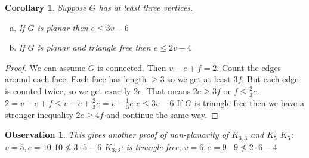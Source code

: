 \documentclass[a4paper]{article}
\theoremstyle{plain}
\newtheorem{corollary}[lemma]{Corollary}
\newtheorem{observation}[lemma]{Observation}
\theoremstyle{myremark}
\begin{document}
\begin{corollary}\begin{minipage}[t]{\linewidth}
Suppose $G$ has at least three vertices.
\begin {enumerate}[(a)]
\item If {$G$} is planar then $e\leqslant3v-6$
\item  If {$G$} is planar and triangle free then $e\leqslant2v-4$
\end {enumerate}
\end {minipage}
\end {corollary}
\begin {proof} We can assume {$G$} is connected. Then $v-e+f=2$.
Count the edges around each face. Each face has length $\geqslant3$ so we get at least ${3f}$.
But each edge is counted twice, so we get exactly $2e$. That means 
$2e\geqslant3f$ or $f\leqslant\frac{2}{3}e$.
\newline
$2=v-e+f\leqslant v-e+ \frac{2}{3}e=v- \frac{1}{3}e$
\newline
$e\leqslant 3v-6$
\newline
If {$G$} is triangle-free then we have a stronger inequality
$2e\geqslant 4f$
and continue the same way.
\end {proof}
\begin {observation} This gives another proof of non-planarity of {$K_{3,3}$} and {$K_5$}
\newline
{$K_5$}: $v=5,e=10$    \: \:\:\:\:\: $10\nleq3\cdot5-6$
\newline
{$K_{3,3}$}: is triangle-free, $v=6, e=9 \: \: \: \: 9\nleq2\cdot6-4$
\end {observation}
\end{document}
